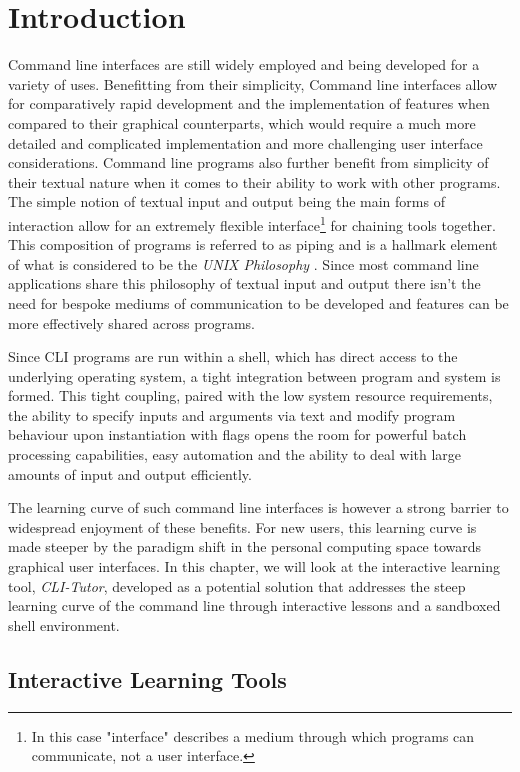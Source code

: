 \chapter{Introduction}
\label{chap:intro}

Command line interfaces are still widely employed and being developed for a
variety of uses. Benefitting from their simplicity, Command line interfaces
allow for comparatively rapid development and the implementation of features
when compared to their graphical counterparts, which would require a much more
detailed and complicated implementation and more challenging user interface
considerations. Command line programs also further benefit from simplicity of
their textual nature when it comes to their ability to work with other
programs. The simple notion of textual input and output being the main forms of
interaction allow for an extremely flexible interface\footnote{In this case
    "interface" describes a medium through which programs can communicate, not
a user interface.} for chaining tools together. This composition of programs is
referred to as piping and is a hallmark element of what is considered to be the
\textit{UNIX Philosophy} \cite{mcilroy1978unix}. Since most command line
applications share this philosophy of textual input and output there isn't the
need for bespoke mediums of communication to be developed and features can be
more effectively shared across programs.

Since CLI programs are run within a shell, which has direct access to the
underlying operating system, a tight integration between program and system is
formed. This tight coupling, paired with the low system resource requirements,
the ability to specify inputs and arguments via text and modify program
behaviour upon instantiation with flags opens the room for powerful batch
processing capabilities, easy automation and the ability to deal with large
amounts of input and output efficiently.

The learning curve of such command line interfaces is however a strong barrier
to widespread enjoyment of these benefits. For new users, this learning curve
is made steeper by the paradigm shift in the personal computing space towards
graphical user interfaces. In this chapter, we will look at the interactive
learning tool, \textit{CLI-Tutor}, developed as a potential solution that
addresses the steep learning curve of the command line through interactive
lessons and a sandboxed shell environment.


\section{Interactive Learning Tools}

